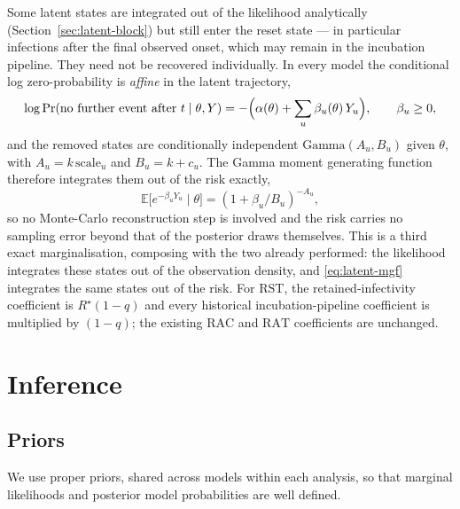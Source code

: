 \documentclass[11pt,a4paper]{article}
\theoremstyle{plain}
\theoremstyle{definition}
\newcommand{\Rreset}{R^{\star}}
\newcommand{\Gam}{\mathrm{Gamma}}
\newcommand{\RAC}{\mathrm{RAC}}
\newcommand{\RAT}{\mathrm{RAT}}
\newcommand{\RST}{\mathrm{RST}}
\begin{document}
Some latent states are integrated out of the likelihood analytically
(Section~\ref{sec:latent-block}) but still enter the reset state --- in particular infections
after the final observed onset, which may remain in the incubation pipeline. They need not be
recovered individually. In every model the conditional log zero-probability is \emph{affine} in
the latent trajectory,
\begin{equation}
\log \Pr(\text{no further event after } t \mid \theta, Y)
  = -\Bigl(\alpha(\theta) + \sum_u \beta_u(\theta)\, Y_u\Bigr),
  \qquad \beta_u \ge 0,
  \label{eq:affine-risk}
\end{equation}
and the removed states are conditionally independent $\Gam(A_u, B_u)$ given $\theta$, with
$A_u = k\,\mathrm{scale}_u$ and $B_u = k + c_u$. The Gamma moment generating function therefore
integrates them out of the risk exactly,
\begin{equation}
\mathbb{E}\bigl[e^{-\beta_u Y_u} \mid \theta\bigr] = (1 + \beta_u / B_u)^{-A_u},
  \label{eq:latent-mgf}
\end{equation}
so no Monte-Carlo reconstruction step is involved and the risk carries no sampling error beyond
that of the posterior draws themselves. This is a third exact marginalisation, composing with the
two already performed: the likelihood integrates these states out of the observation density, and
\eqref{eq:latent-mgf} integrates the same states out of the risk.
For $\RST$, the retained-infectivity coefficient is $\Rreset(1-q)$ and every historical
incubation-pipeline coefficient is multiplied by $(1-q)$; the existing $\RAC$ and $\RAT$
coefficients are unchanged.

\section{Inference}
\label{sec:inference}

\subsection{Priors}
\label{sec:priors}

We use proper priors, shared across models within each analysis, so that marginal likelihoods
and posterior model probabilities are well defined.
\end{document}

